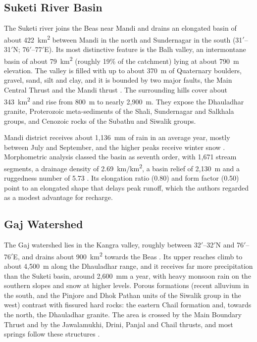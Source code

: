 \documentclass[10pt,a4paper,twocolumn]{article}
\newcommand{\kmsq}{km\textsuperscript{2}}
\begin{document}
\subsection{Suketi River Basin}

The Suketi river joins the Beas near Mandi and drains an elongated basin of about 422~\kmsq{}
between Mandi in the north and Sundernagar in the south (31$'$--31$'$N;
76$'$--77$'$E). Its most distinctive feature is the Balh valley, an
intermontane basin of about 79~\kmsq{} (roughly 19\% of the catchment) lying at about
790~m elevation. The valley is filled with up to about 370~m of Quaternary boulders, gravel,
sand, silt and clay, and it is bounded by two major faults, the Main Central Thrust and the Mandi thrust
\citep{srikantia1998,pophare2018}. The surrounding hills cover about 343~\kmsq{} and rise from
800~m to nearly 2,900~m. They expose the Dhauladhar granite, Proterozoic meta-sediments of the
Shali, Sundernagar and Salkhala groups, and Cenozoic rocks of the Subathu and Siwalik groups.

Mandi district receives about 1,136~mm of rain in an average year, mostly between July and
September, and the higher peaks receive winter snow \citep{cgwb2006}. Morphometric analysis
classed the basin as seventh order, with 1,671 stream segments, a drainage density of
2.69~km/km\textsuperscript{2}, a basin relief of 2,130~m and a ruggedness number of 5.73
\citep{pophare2014,pophare2015}. Its elongation ratio (0.80) and form factor (0.50) point to an
elongated shape that delays peak runoff, which the authors regarded as a modest advantage for
recharge.

\subsection{Gaj Watershed}

The Gaj watershed lies in the Kangra valley, roughly between 32$'$--32$'$N
and 76$'$--76$'$E, and drains about 900~\kmsq{} towards the Beas
\citep{sharma2025}. Its upper reaches climb to about 4,500~m along the Dhauladhar range, and it
receives far more precipitation than the Suketi basin, around 2,600~mm a year, with heavy
monsoon rain on the southern slopes and snow at higher levels. Porous formations (recent
alluvium in the south, and the Pinjore and Dhok Pathan units of the Siwalik group in the west)
contrast with fissured hard rocks: the eastern Chail formation and, towards the north, the
Dhauladhar granite. The area is crossed by the Main Boundary Thrust and by the Jawalamukhi, Drini,
Panjal and Chail thrusts, and most springs follow these structures \citep{kumar2001,sharma2025}.
\end{document}
